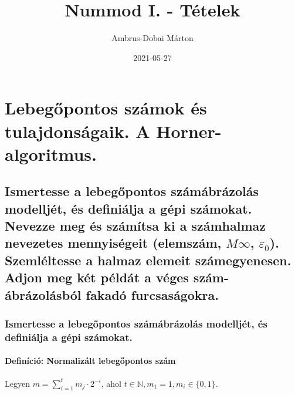 \documentclass{article}
\title{Nummod I. - Tételek}
\date{2021-05-27}
\author{Ambrus-Dobai Márton}
\begin{document}
    \maketitle
    \section{Lebegőpontos számok és tulajdonságaik. A Horner-algoritmus.}

    \subsection{
    Ismertesse a lebegőpontos számábrázolás modelljét, és definiálja a gépi számokat.
    Nevezze meg és számítsa ki a számhalmaz nevezetes mennyiségeit (elemszám, $M\infty$, $\varepsilon_0$).
    Szemléltesse a halmaz elemeit számegyenesen. Adjon meg két példát a véges szám-ábrázolásból fakadó furcsaságokra.
    }

    \subsubsection{Ismertesse a lebegőpontos számábrázolás modelljét, és definiálja a gépi számokat.}
    \paragraph{Definíció: Normalizált lebegőpontos szám}
    
    Legyen $m = \sum^{t}_{i=1} m_j\cdot2^{-i}$, ahol $ t \in \mathbb{N}, m_1 = 1, m_i \in \{0,1\}$. 


    \par
\end{document}
